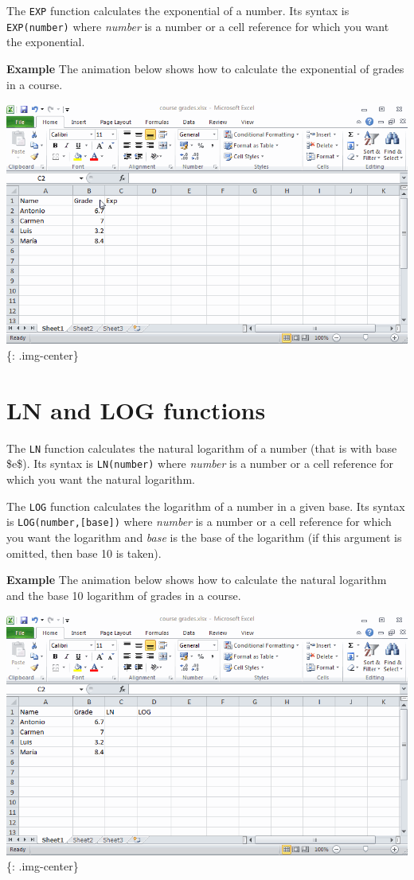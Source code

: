 The \texttt{EXP} function calculates the exponential of a number. Its syntax is \texttt{EXP(number)} where \emph{number} is a number or a cell reference for which you want the exponential. 

\textbf{Example} The animation below shows how to calculate the exponential of grades in a course.

\includegraphics[keepaspectratio,width=\textwidth,height=0.75\textheight]{img/example_function_exp.gif}
\{: .img-center\}

\section{LN and LOG functions}
\label{lnandlogfunctions}

The \texttt{LN} function calculates the natural logarithm of a number (that is with base \$e\$). Its syntax is \texttt{LN(number)} where \emph{number} is a number or a cell reference for which you want the natural logarithm. 

The \texttt{LOG} function calculates the logarithm of a number in a given base. Its syntax is \texttt{LOG(number,[base])} where \emph{number} is a number or a cell reference for which you want the logarithm and \emph{base} is the base of the logarithm (if this argument is omitted, then base 10 is taken). 

\textbf{Example} The animation below shows how to calculate the natural logarithm and the base 10 logarithm of grades in a course.

\includegraphics[keepaspectratio,width=\textwidth,height=0.75\textheight]{img/example_function_ln.gif}
\{: .img-center\}

